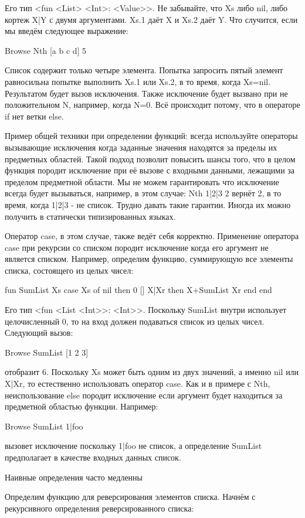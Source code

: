 Его тип <fun { <List> <Int>}: <Value>>. Не забывайте, что Xs либо nil, либо кортеж X|Y с двумя аргументами. Xs.1 даёт X и Xs.2 даёт Y. Что случится, если мы введём следующее выражение:

{Browse {Nth [a b c d] 5}}

Список содержит только четыре элемента. Попытка запросить пятый элемент равносильна попытке выполнить Xs.1 или Xs.2, в то время, когда Xs=nil. Результатом будет вызов исключения. Также исключение будет вызвано при не положительном N, например, когда N=0. Всё происходит потому, что в операторе if нет ветки else.

Пример общей техники при определении функций: всегда используйте операторы вызывающие исключения когда заданные значения находятся за пределы их предметных областей. Такой подход позволит повысить шансы того, что в целом функция породит исключение при её вызове с входными данными, лежащими за пределом предметной области. Мы не можем гарантировать что исключение всегда будет вызываться, например, в этом случае: {Nth 1|2|3 2} вернёт 2, в то время, когда 1|2|3 - не список. Трудно давать такие гарантии. Иногда их можно получить в статически типизированных языках.

Оператор case, в этом случае, также ведёт себя корректно. Применение оператора case при рекурсии со списком породит исключение когда его аргумент не является списком. Например, определим функцию, суммирующую все элементы списка, состоящего из целых чисел:

fun {SumList Xs}
case Xs
of nil then 0
[] X|Xr then X+{SumList Xr}
end
end

Его тип <fun { <List <Int>>}: <Int>>. Поскольку SumList внутри использует целочисленный 0, то на вход должен подаваться список из целых чисел. Следующий вызов:

{Browse {SumList [1 2 3]}}

отобразит 6. Поскольку Xs может быть одним из двух значений, а именно nil или X|Xr, то естественно использовать оператор case. Как и в примере с Nth, неиспользование else породит исключение если аргумент будет находиться за предметной областью функции. Например:

{Browse {SumList 1|foo}}

вызовет исключение поскольку 1|foo не список, а определение SumList предполагает в качестве входных данных список.

Наивные определения часто медленны

Определим функцию для реверсирования элементов списка. Начнём с рекурсивного определения реверсированного списка:

